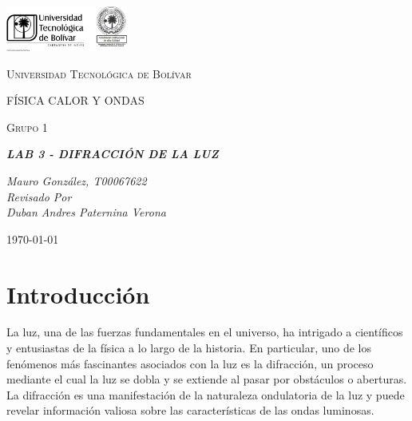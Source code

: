 \documentclass[twocolumn, 12pt]{article}
\begin{document}
\begin{titlepage}
    \centering
    \includegraphics[width=0.3\textwidth]{Images/logo_utb.png}\par\vspace{1cm}
    {\scshape\LARGE Universidad Tecnológica de Bolívar \par}
    \vspace{1cm}

    {\scshape\Large FÍSICA CALOR Y ONDAS \par}
    \vspace{.2cm}

    {\scshape\Large Grupo 1 \par}
    \vspace{1cm}
    \slshape {\Large \bfseries{}LAB 3 - DIFRACCIÓN DE LA LUZ\\}
    \vspace{4cm}

    \slshape {\itshape{} Mauro González, T00067622 \\}
    \vfill
    Revisado Por \\
    Duban Andres Paternina Verona\\
    {\large \today\par}
\end{titlepage}

\section{Introducción}

La luz, una de las fuerzas fundamentales en el universo, ha
intrigado a científicos y entusiastas de la física a lo
largo de la historia. En particular, uno de los fenómenos
más fascinantes asociados con la luz es la difracción, un
proceso mediante el cual la luz se dobla y se extiende al
pasar por obstáculos o aberturas. La difracción es una
manifestación de la naturaleza ondulatoria de la luz y
puede revelar información valiosa sobre las características
de las ondas luminosas.
\end{document}
